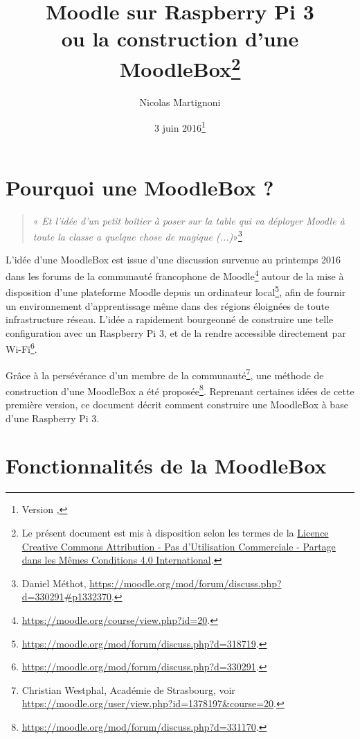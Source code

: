 \documentclass[11pt]{article}
\begin{document}
\title{Moodle sur Raspberry Pi 3\\ ou la construction d'une MoodleBox\footnote{Le présent document est mis à disposition selon les termes de la \href{http://creativecommons.org/licenses/by-nc-sa/4.0/}{Licence Creative Commons Attribution - Pas d'Utilisation Commerciale - Partage dans les Mêmes Conditions 4.0 International}.}}
\date{3 juin 2016\footnote{Version \gitAbbrevHash, \gitAuthorDate}}
\author{Nicolas Martignoni}
\maketitle

\begingroup
\setlength{\parskip}{0pt}
\tableofcontents
\endgroup

\section{Pourquoi une MoodleBox ?}

\begin{quote}
\noindent « \emph{Et l'idée d'un petit boîtier à poser sur la table qui va déployer Moodle à toute la classe a quelque chose de magique (...)}»\footnote{Daniel Méthot, \url{https://moodle.org/mod/forum/discuss.php?d=330291\#p1332370}.}
\end{quote}

L'idée d'une MoodleBox est issue d'une discussion survenue au printemps 2016 dans les forums de la communauté francophone de Moodle\footnote{\url{https://moodle.org/course/view.php?id=20}.} autour de la mise à disposition d'une plateforme Moodle depuis un ordinateur local\footnote{\url{https://moodle.org/mod/forum/discuss.php?d=318719}.}, afin de fournir un environnement d'apprentissage même dans des régions éloignées de toute infrastructure réseau. L'idée a rapidement bourgeonné de construire une telle configuration avec un Raspberry Pi 3, et de la rendre accessible directement par Wi-Fi\footnote{\url{https://moodle.org/mod/forum/discuss.php?d=330291}.}.

Grâce à la persévérance d'un membre de la communauté\footnote{Christian Westphal, Académie de Strasbourg, voir \url{https://moodle.org/user/view.php?id=1378197&course=20}.}, une méthode de construction d'une MoodleBox a été proposée\footnote{\url{https://moodle.org/mod/forum/discuss.php?d=331170}.}. Reprenant certaines idées de cette première version, ce document décrit comment construire une MoodleBox à base d'une Raspberry Pi 3.

\section{Fonctionnalités de la MoodleBox}
\end{document}
